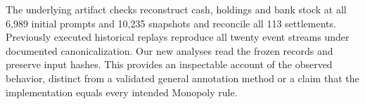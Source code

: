 The underlying artifact checks reconstruct cash, holdings and bank stock at all 6,989 initial prompts and 10,235 snapshots and reconcile all 113 settlements. Previously executed historical replays reproduce all twenty event streams under documented canonicalization. Our new analyses read the frozen records and preserve input hashes. This provides an inspectable account of the observed behavior, distinct from a validated general annotation method or a claim that the implementation equals every intended Monopoly rule.
